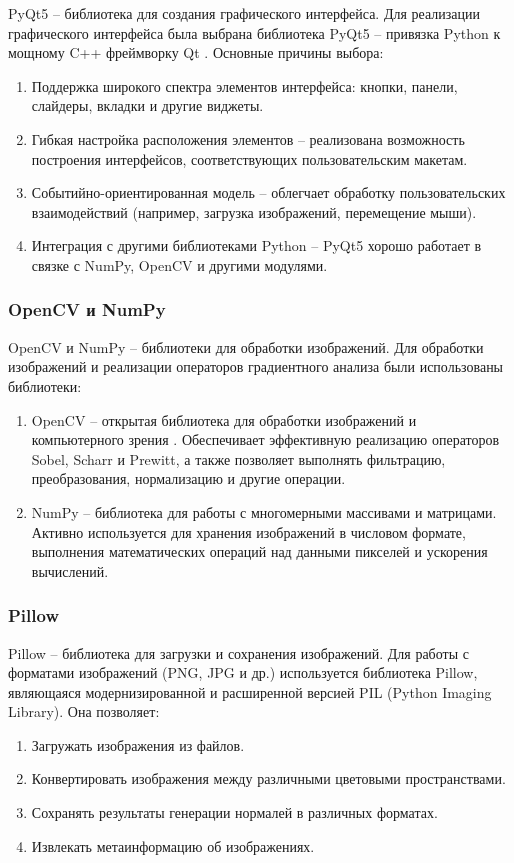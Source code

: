 PyQt5 -- библиотека для создания графического интерфейса. Для реализации графического интерфейса была выбрана библиотека PyQt5 -- привязка Python к мощному C++ фреймворку Qt \cite{talipov2020}. Основные причины выбора:
\begin{enumerate}
	\item Поддержка широкого спектра элементов интерфейса: кнопки, панели, слайдеры, вкладки и другие виджеты.
	\item Гибкая настройка расположения элементов -- реализована возможность построения интерфейсов, соответствующих пользовательским макетам.
	\item Событийно-ориентированная модель -- облегчает обработку пользовательских взаимодействий (например, загрузка изображений, перемещение мыши).
	\item Интеграция с другими библиотеками Python -- PyQt5 хорошо работает в связке с NumPy, OpenCV и другими модулями.
\end{enumerate}
\subsubsection{OpenCV и NumPy}

OpenCV и NumPy -- библиотеки для обработки изображений. Для обработки изображений и реализации операторов градиентного анализа были использованы библиотеки:
\begin{enumerate}
	\item OpenCV -- открытая библиотека для обработки изображений и компьютерного зрения \cite{kaehler2021}. Обеспечивает эффективную реализацию операторов Sobel, Scharr и Prewitt, а также позволяет выполнять фильтрацию, преобразования, нормализацию и другие операции.
	\item NumPy -- библиотека для работы с многомерными массивами и матрицами. Активно используется для хранения изображений в числовом формате, выполнения математических операций над данными пикселей и ускорения вычислений.
\end{enumerate}
\subsubsection{Pillow}

Pillow -- библиотека для загрузки и сохранения изображений. Для работы с форматами изображений (PNG, JPG и др.) используется библиотека Pillow, являющаяся модернизированной и расширенной версией PIL (Python Imaging Library). Она позволяет:
\begin{enumerate}
	\item Загружать изображения из файлов.
	\item Конвертировать изображения между различными цветовыми пространствами.
	\item Сохранять результаты генерации нормалей в различных форматах.
	\item Извлекать метаинформацию об изображениях.
\end{enumerate}

